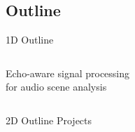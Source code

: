 \subsection{Outline}

\begin{frame}{1D Outline}
    \begin{columns}
        \begin{column}{0.3\textwidth}
            Echo-aware signal processing
            \\for audio scene analysis
        \end{column}
        \begin{column}{0.6\textwidth}
            \color{white}
            \tableofcontents
        \end{column}
    \end{columns}
\end{frame}

\begin{frame}{2D Outline}
    Projects
\end{frame}